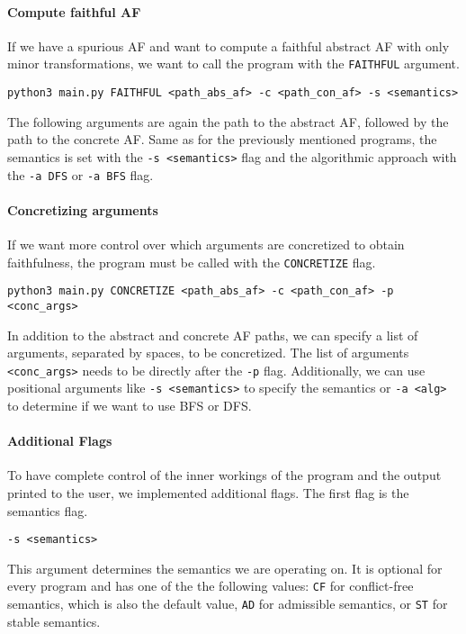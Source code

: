 \paragraph{Compute faithful AF} If we have a spurious AF and want to compute a faithful abstract AF with only minor transformations, we want to call the program with the \texttt{FAITHFUL} argument.

\begin{center}
    \texttt{python3 main.py FAITHFUL <path\_abs\_af> -c <path\_con\_af> -s <semantics>}
\end{center}

The following arguments are again the path to the abstract AF, followed by the path to the concrete AF. Same as for the previously mentioned programs, the semantics is set with the \texttt{-s <semantics>} flag and the algorithmic approach with the \texttt{-a DFS} or \texttt{-a BFS} flag.

\paragraph{Concretizing arguments} If we want more control over which arguments are concretized to obtain faithfulness, the program must be called with the \texttt{CONCRETIZE} flag.

\begin{center}
    \texttt{python3 main.py CONCRETIZE <path\_abs\_af> -c <path\_con\_af> -p <conc\_args>}
\end{center}

In addition to the abstract and concrete AF paths, we can specify a list of arguments, separated by spaces, to be concretized. The list of arguments \texttt{<conc\_args>} needs to be directly after the \texttt{-p} flag. Additionally, we can use positional arguments like \texttt{-s <semantics>} to specify the semantics or \texttt{-a <alg>} to determine if we want to use BFS or DFS.

\paragraph{Additional Flags} To have complete control of the inner workings of the program and the output printed to the user, we implemented additional flags. The first flag is the semantics flag.

\begin{center}
    \texttt{-s <semantics>}
\end{center}

This argument determines the semantics we are operating on. It is optional for every program and has one of the the following values: \texttt{CF} for conflict-free semantics, which is also the default value, \texttt{AD} for admissible semantics, or \texttt{ST} for stable semantics. 


